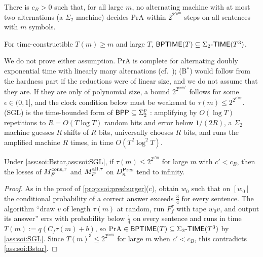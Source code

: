 \begin{assumption}\label{ass:soi:Bstar}
There is $c_B>0$ such that, for all large $m$, no alternating machine with at most two alternations (a $\Sigma_2$ machine) decides $\mathrm{PrA}$ within $2^{2^{c_Bm}}$ steps on all sentences with $m$ symbols.
\end{assumption}

\begin{assumption}\label{ass:soi:SGL}
For time-constructible $T(m)\ge m$ and large $T$, $\mathsf{BPTIME}(T)\subseteq\Sigma_2\text{-}\mathsf{TIME}(T^3)$.
\end{assumption}

We do not prove either assumption. $\mathrm{PrA}$ is complete for alternating doubly exponential time with linearly many alternations (cf.\ \citealp{berman1980complexity}); (B$^*$) would follow from the hardness part if the reductions were of linear size, and we do not assume that they are. If they are only of polynomial size, a bound $2^{2^{c_Bm^\epsilon}}$ follows for some $\epsilon\in(0,1]$, and the clock condition below must be weakened to $\tau(m)\le2^{2^{c'm^\epsilon}}$. (SGL) is the time-bounded form of $\mathsf{BPP}\subseteq\Sigma_2^p$ \citep{sipser1983complexity,lautemann1983bpp}: amplifying by $O(\log T)$ repetitions to $R=O(T\log T)$ random bits and error below $1/(2R)$, a $\Sigma_2$ machine guesses $R$ shifts of $R$ bits, universally chooses $R$ bits, and runs the amplified machine $R$ times, in time $O(T^2\log^2T)$.

\begin{proposition}\label{prop:soi:presburgerCond}
Under \cref{ass:soi:Bstar,ass:soi:SGL}, if $\tau(m)\le2^{2^{c'm}}$ for large $m$ with $c'<c_B$, then the losses of $M_{F}^{\mathrm{cons},\tau}$ and $M_{F}^{\mathrm{all},\tau}$ on $D^{\rm Pres}_n$ tend to infinity.
\end{proposition}

\begin{proof}
As in the proof of \cref{prop:soi:presburger}(c), obtain $w_0$ such that on $[w_0]$ the conditional probability of a correct answer exceeds $\frac34$ for every sentence. The algorithm ``draw $v$ of length $\tau(m)$ at random, run $F^\tau_f$ with tape $w_0v$, and output its answer'' errs with probability below $\frac14$ on every sentence and runs in time $T(m):=q(C_f\tau(m)+b)$, so $\mathrm{PrA}\in\mathsf{BPTIME}(T)\subseteq\Sigma_2\text{-}\mathsf{TIME}(T^3)$ by \cref{ass:soi:SGL}. Since $T(m)^3\le2^{2^{c_Bm}}$ for large $m$ when $c'<c_B$, this contradicts \cref{ass:soi:Bstar}.
\end{proof}


